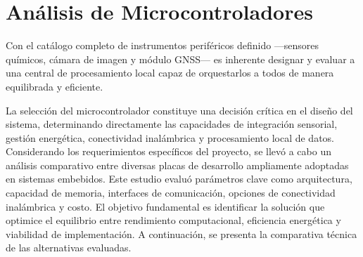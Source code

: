 \section{Análisis de Microcontroladores} 
\label{sec:analisis_microcontroladores}   
Con el catálogo completo de instrumentos periféricos definido —sensores químicos, cámara de imagen y módulo GNSS— es inherente designar y evaluar a una central de procesamiento local capaz de orquestarlos a todos de manera equilibrada y eficiente.


La selección del microcontrolador constituye una decisión crítica en el diseño del sistema, determinando directamente las capacidades de integración sensorial, gestión energética, conectividad inalámbrica y procesamiento local de datos. Considerando los requerimientos específicos del proyecto, se llevó a cabo un análisis comparativo entre diversas placas de desarrollo ampliamente adoptadas en sistemas embebidos. Este estudio evaluó parámetros clave como arquitectura, capacidad de memoria, interfaces de comunicación, opciones de conectividad inalámbrica y costo. El objetivo fundamental es identificar la solución que optimice el equilibrio entre rendimiento computacional, eficiencia energética y viabilidad de implementación. A continuación, se presenta la comparativa técnica de las alternativas evaluadas.  

 

\begin{table}[H]
\centering
\caption{Comparativa de microcontroladores para nodos fluviales}
\end{table}

